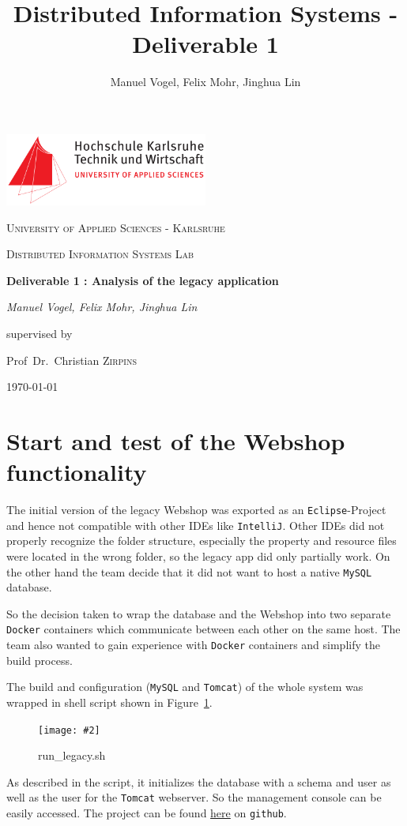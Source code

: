 \documentclass[11pt]{article}
\title{Distributed Information Systems - Deliverable 1}
\author{Manuel Vogel, Felix Mohr, Jinghua Lin}
\newcommand{\cgraphic}[3]
{
	\begin{figure}[htb]
		\begin{center}
		\texttt{[image: \#2]}
		\end{center}
		\caption{#3}
		\label{fig:#2}
	\end{figure}
}%
\begin{document}
	\begin{titlepage}
		\centering
		\includegraphics[width=0.5\textwidth]{hska-logo}\par\vspace{1cm}
		{\scshape\LARGE University of Applied Sciences - Karlsruhe \par}
		\vspace{1cm}
		{\scshape\Large Distributed Information Systems Lab\par}
		\vspace{1.5cm}
		{\huge\bfseries Deliverable 1 : Analysis of the legacy application\par}
		\vspace{2cm}
		{\Large\itshape Manuel Vogel, Felix Mohr,  Jinghua Lin\par}
		\vfill
		supervised by\par
		Prof~Dr.~Christian \textsc{Zirpins}
		\vfill
		{\large \today\par}
	\end{titlepage}
	
	\section{Start and test of the Webshop functionality}
	The initial version of the legacy Webshop was exported as an \texttt{Eclipse}-Project and hence not compatible with other IDEs like \texttt{IntelliJ}. Other IDEs did not properly recognize the folder structure, especially the property and resource files were located in the wrong folder, so the legacy app did only partially work. On the other hand the team decide that it did not want to host a native \texttt{MySQL} database.
	
	So the decision taken to wrap the database and the Webshop into two separate \texttt{Docker} containers which communicate between each other on the same host. The team also wanted to gain experience with \texttt{Docker} containers and simplify the build process.

	The build and configuration (\texttt{MySQL} and \texttt{Tomcat}) of the whole system was wrapped in shell script shown in Figure~\ref{fig:legacy-sh}.
	\cgraphic{.35}{legacy-sh}{run\_legacy.sh}
	
	As described in the script, it initializes the database with a schema and user as well as the user for the \texttt{Tomcat} webserver. So the management console can be easily accessed. The project can be found \href{https://github.com/mavogel/vis-lab}{here} on \texttt{github}.
	
\end{document}
